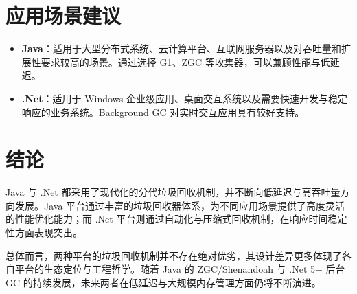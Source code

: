 \section{应用场景建议}

\begin{itemize}
    \item \textbf{Java}：适用于大型分布式系统、云计算平台、互联网服务器以及对吞吐量和扩展性要求较高的场景。通过选择 G1、ZGC 等收集器，可以兼顾性能与低延迟。
    
    \item \textbf{.Net}：适用于 Windows 企业级应用、桌面交互系统以及需要快速开发与稳定响应的业务系统。Background GC 对实时交互应用具有较好支持。
\end{itemize}

\section{结论}

Java 与 .Net 都采用了现代化的分代垃圾回收机制，并不断向低延迟与高吞吐量方向发展。Java 平台通过丰富的垃圾回收器体系，为不同应用场景提供了高度灵活的性能优化能力；而 .Net 平台则通过自动化与压缩式回收机制，在响应时间稳定性方面表现突出。

总体而言，两种平台的垃圾回收机制并不存在绝对优劣，其设计差异更多体现了各自平台的生态定位与工程哲学。随着 Java 的 ZGC/Shenandoah 与 .Net 5+ 后台 GC 的持续发展，未来两者在低延迟与大规模内存管理方面仍将不断演进。